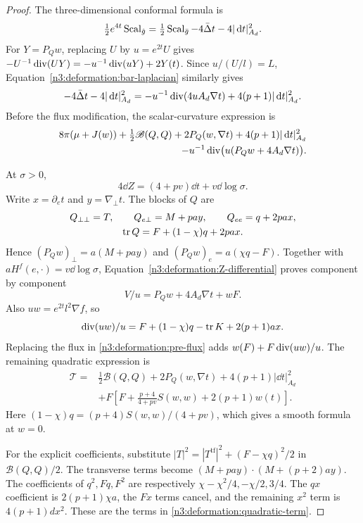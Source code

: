 \begin{proof}
The three-dimensional conformal formula is
\[
 \tfrac12e^{4t}\operatorname{Scal}_{\hat g}
 =\tfrac12\operatorname{Scal}_{\bar g}-4\bar\Delta t-4|\,\mathrm d t|_{A_d}^2.
\]
For $Y=P_Qw$, replacing $U$ by $u=e^{2t}U$ gives
$-U^{-1}\operatorname{div}(UY)=-u^{-1}\operatorname{div}(uY)+2Y(t)$.
Since $u/(U/l)=L$, Equation~\eqref{n3:deformation:bar-laplacian} similarly gives
\[
 -4\bar\Delta t-4|\,\mathrm d t|_{A_d}^2
 =-u^{-1}\operatorname{div}(4uA_d\nabla t)+4(p+1)|\,\mathrm d t|_{A_d}^2.
\]
Before the flux modification, the scalar-curvature expression is
\begin{equation}\label{n3:deformation:pre-flux}
 \begin{split}
 8\pi(\mu+J(w))+\tfrac12\mathscr B(Q,Q)
 +2P_Q(w,\nabla t)+4(p+1)|\,\mathrm d t|_{A_d}^2\\
 -u^{-1}\operatorname{div}\bigl(u(P_Qw+4A_d\nabla t)\bigr).
 \end{split}
\end{equation}

At $\sigma>0$,
\begin{equation}\label{n3:deformation:Z-differential}
 4\dd Z=(4+pv)\dd t+v\dd\log\sigma.
\end{equation}
Write $x=\partial_e t$ and $y=\nabla_\perp t$. The blocks of $Q$ are
\[
 \begin{gathered}
 Q_{\perp\perp}=T,\qquad Q_{e\perp}=M+pay,\qquad Q_{ee}=q+2pax,\\
 \operatorname{tr} Q=F+(1-\chi)q+2pax.
 \end{gathered}
\]
Hence $(P_Qw)_\perp=a(M+pay)$ and $(P_Qw)_e=a(\chi q-F)$.
Together with $aH^f(e,\cdot)=v\dd\log\sigma$,
Equation~\eqref{n3:deformation:Z-differential} proves component by component
\begin{equation}\label{n3:deformation:flux-rewrite}
 V/u=P_Qw+4A_d\nabla t+wF.
\end{equation}
Also $uw=e^{2t}l^2\nabla f$, so
\begin{equation}\label{n3:deformation:uw-divergence}
 \operatorname{div}(uw)/u
 =F+(1-\chi)q-\operatorname{tr} K+2(p+1)ax.
\end{equation}
Replacing the flux in \eqref{n3:deformation:pre-flux} adds
$w(F)+F\operatorname{div}(uw)/u$. The remaining quadratic expression is
\begin{equation}\label{n3:deformation:quadratic-invariant}
 \begin{split}
 \mathcal T={}&\tfrac12\mathscr B(Q,Q)+2P_Q(w,\nabla t)
                  +4(p+1)|\dd t|_{A_d}^2\\
 &+F\left[F+\frac{p+4}{4+pv}S(w,w)+2(p+1)w(t)\right].
 \end{split}
\end{equation}
Here $(1-\chi)q=(p+4)S(w,w)/(4+pv)$,
which gives a smooth formula at $w=0$.

For the explicit coefficients, substitute
$|T|^2=|T^{\operatorname{tf}}|^2+(F-\chi q)^2/2$ in
$\mathscr B(Q,Q)/2$.
The transverse terms become $(M+pay)\cdot(M+(p+2)ay)$.
The coefficients of $q^2,Fq,F^2$ are respectively
$\chi-\chi^2/4,-\chi/2,3/4$.
The $qx$ coefficient is $2(p+1)\chi a$, the $Fx$ terms cancel, and
the remaining $x^2$ term is $4(p+1)dx^2$.
These are the terms in \eqref{n3:deformation:quadratic-term}.
\end{proof}

